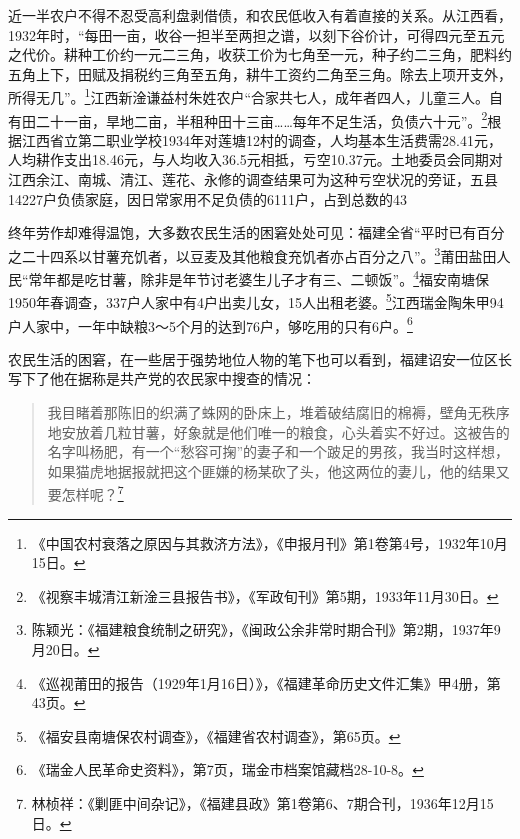 近一半农户不得不忍受高利盘剥借债，和农民低收入有着直接的关系。从江西看，1932年时，“每田一亩，收谷一担半至两担之谱，以刻下谷价计，可得四元至五元之代价。耕种工价约一元二三角，收获工价为七角至一元，种子约二三角，肥料约五角上下，田赋及捐税约三角至五角，耕牛工资约二角至三角。除去上项开支外，所得无几”。\footnote{《中国农村衰落之原因与其救济方法》，《申报月刊》第1卷第4号，1932年10月15日。}江西新淦谦益村朱姓农户“合家共七人，成年者四人，儿童三人。自有田二十一亩，旱地二亩，半租种田十三亩……每年不足生活，负债六十元”。\footnote{《视察丰城清江新淦三县报告书》，《军政旬刊》第5期，1933年11月30日。}根据江西省立第二职业学校1934年对莲塘12村的调查，人均基本生活费需28.41元，人均耕作支出18.46元，与人均收入36.5元相抵，亏空10.37元。土地委员会同期对江西余江、南城、清江、莲花、永修的调查结果可为这种亏空状况的旁证，五县14227户负债家庭，因日常家用不足负债的6111户，占到总数的43%


终年劳作却难得温饱，大多数农民生活的困窘处处可见：福建全省“平时已有百分之二十四系以甘薯充饥者，以豆麦及其他粮食充饥者亦占百分之八”。\footnote{陈颖光：《福建粮食统制之研究》，《闽政公余非常时期合刊》第2期，1937年9月20日。}莆田盐田人民“常年都是吃甘薯，除非是年节讨老婆生儿子才有三、二顿饭”。\footnote{《巡视莆田的报告（1929年1月16日）》，《福建革命历史文件汇集》甲4册，第43页。}福安南塘保1950年春调查，337户人家中有4户出卖儿女，15人出租老婆。\footnote{《福安县南塘保农村调查》，《福建省农村调查》，第65页。}江西瑞金陶朱甲94户人家中，一年中缺粮3～5个月的达到76户，够吃用的只有6户。\footnote{《瑞金人民革命史资料》，第7页，瑞金市档案馆藏档28-10-8。}


农民生活的困窘，在一些居于强势地位人物的笔下也可以看到，福建诏安一位区长写下了他在据称是共产党的农民家中搜查的情况：

\begin{quote}

我目睹着那陈旧的织满了蛛网的卧床上，堆着破结腐旧的棉褥，壁角无秩序地安放着几粒甘薯，好象就是他们唯一的粮食，心头着实不好过。这被告的名字叫杨肥，有一个“愁容可掬”的妻子和一个跛足的男孩，我当时这样想，如果猫虎地据报就把这个匪嫌的杨某砍了头，他这两位的妻儿，他的结果又要怎样呢？\footnote{林桢祥：《剿匪中间杂记》，《福建县政》第1卷第6、7期合刊，1936年12月15日。}
\end{quote}


